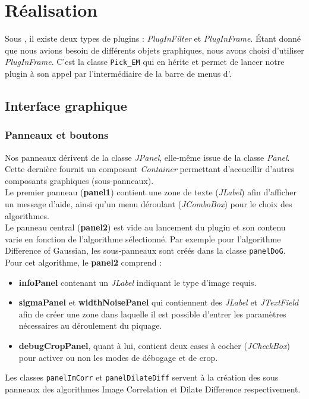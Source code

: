 \newsavebox{\fmbox}
\newenvironment{fmpage}[1]
     {\begin{lrbox}{\fmbox}\begin{minipage}{#1}}
     {\end{minipage}\end{lrbox}\fbox{\usebox{\fmbox}}}

\chapter{Réalisation}

Sous \imj, il existe deux types de plugins : \emph{PlugInFilter} et \emph{PlugInFrame}. Étant donné que nous avions besoin de différents objets graphiques, nous avons choisi d'utiliser \emph{PlugInFrame}. C'est la classe \texttt{Pick\_EM} qui en hérite et permet de lancer notre plugin à son appel par l'intermédiaire de la barre de menus d'\imj.

\section{Interface graphique}

\subsection{Panneaux et boutons}

Nos panneaux dérivent de la classe \emph{JPanel}, elle-même issue de la classe \emph{Panel}. Cette dernière fournit un composant \emph{Container} permettant d'accueillir d'autres composants graphiques (sous-panneaux).\\

Le premier panneau (\textbf{panel1}) contient une zone de texte (\emph{JLabel}) afin d'afficher un message d'aide, ainsi qu'un menu déroulant (\emph{JComboBox}) pour le choix des algorithmes. \\

Le panneau central (\textbf{panel2}) est vide au lancement du plugin et son contenu varie en fonction de l'algorithme sélectionné. Par exemple pour l'algorithme Difference of Gaussian, les sous-panneaux sont créés dans la classe \texttt{panelDoG}. Pour cet algorithme, le \textbf{panel2} comprend :
\begin{itemize}
\item \textbf{infoPanel} contenant un \emph{JLabel} indiquant le type d'image requis.
\item \textbf{sigmaPanel} et \textbf{widthNoisePanel} qui contiennent des \emph{JLabel} et \emph{JTextField} afin de créer une zone dans laquelle il est possible d'entrer les paramètres nécessaires au déroulement du piquage. 
\item \textbf{debugCropPanel}, quant à lui, contient deux cases à cocher (\emph{JCheckBox}) pour activer ou non les modes de débogage et de crop. 
\end{itemize}
Les classes \texttt{panelImCorr} et \texttt{panelDilateDiff} servent à la création des sous panneaux des algorithmes Image Correlation et Dilate Difference respectivement. \\

